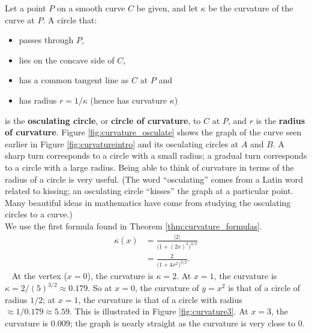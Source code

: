 Let a point $P$ on a smooth curve $C$  be given, and let $\kappa$ be the curvature of the curve at $P$. A circle that:
	\begin{itemize}
		\item passes through $P$,
		\item	lies on the concave side of $C$,
		\item	has a common tangent line as $C$ at $P$ and
		\item	has radius $r=1/\kappa$ (hence has curvature $\kappa$)
	\end{itemize}
is the \textbf{osculating circle}, or \textbf{circle of curvature}, to $C$ at $P$, and $r$ is the \textbf{radius of curvature}. %
Figure \ref{fig:curvature_osculate} shows the graph of the curve seen earlier in Figure \ref{fig:curvatureintro} and its osculating circles at $A$ and $B$. A sharp turn corresponds to a circle with a small radius; a gradual turn corresponds to a circle with a large radius. Being able to think of curvature in terms of the radius of a circle is very useful.
 (The word ``osculating'' comes from a Latin word related to kissing; an osculating circle ``kisses'' the graph at a particular point. Many beautiful ideas in mathematics have come from studying the osculating circles to a curve.)\\

{We use the first formula found in Theorem \ref{thm:curvature_formulas}. 
\begin{align*}
\kappa(x) &= \frac{\lvert 2\rvert}{\big(1+(2x)^2\big)^{3/2}} \\
			&= \frac2{\big(1+4x^2\big)^{3/2}}.
\end{align*}\
At the vertex ($x=0$), the curvature is $\kappa = 2$. At $x=1$, the curvature is $\kappa = 2/(5)^{3/2} \approx 0.179.$ So at $x=0$, the curvature of $y=x^2$ is that of a circle of radius $1/2$; at $x=1$, the curvature is that of a circle with radius $\approx 1/0.179 \approx 5.59$. This is illustrated in Figure \ref{fig:curvature3}. At $x=3$, the curvature is $0.009$; the graph is nearly straight as the curvature is very close to 0. 
}\\

